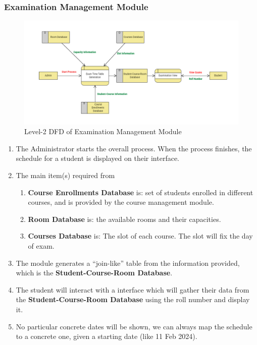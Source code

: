\documentclass[12pt,a4paper]{article}
\begin{document}
\subsubsection{Examination Management Module}
\begin{figure}[H]
    \centering
        \includegraphics[width=\linewidth]{ExamManagement_Level2_DFD.png} 
    \caption{Level-2 DFD of Examination Management Module}
\end{figure}
\begin{enumerate}
    \item The Administrator starts the overall process. When the process finishes, the schedule for a student is displayed on their interface.
    \item The main item(s) required from 
        \begin{enumerate}
            \item \textbf{Course Enrollments Database} is: set of students enrolled in different courses, and is provided by the course management module.
            \item \textbf{Room Database} is: the available rooms and their capacities.
            \item \textbf{Courses Database} is: The slot of each course. The slot will fix the day of exam.
        \end{enumerate}
    \item The module generates a ``join-like'' table from the information provided, which is the \textbf{Student-Course-Room Database}.
    \item The student will interact with a interface which will gather their data from the \textbf{Student-Course-Room Database} using the roll number and display it.
    \item No particular concrete dates will be shown, we can always map the schedule to a concrete one, given a starting date (like 11 Feb 2024).
\end{enumerate}
\end{document}

